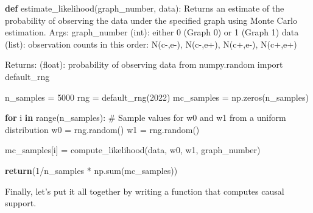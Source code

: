\documentclass[
  letterpaper,
  DIV=11,
  numbers=noendperiod]{scrreprt}
\newenvironment{Shaded}{\begin{snugshade}}{\end{snugshade}}
\newcommand{\BuiltInTok}[1]{\textcolor[rgb]{0.00,0.23,0.31}{#1}}
\newcommand{\CommentTok}[1]{\textcolor[rgb]{0.37,0.37,0.37}{#1}}
\newcommand{\ControlFlowTok}[1]{\textcolor[rgb]{0.00,0.23,0.31}{\textbf{#1}}}
\newcommand{\DecValTok}[1]{\textcolor[rgb]{0.68,0.00,0.00}{#1}}
\newcommand{\ImportTok}[1]{\textcolor[rgb]{0.00,0.46,0.62}{#1}}
\newcommand{\KeywordTok}[1]{\textcolor[rgb]{0.00,0.23,0.31}{\textbf{#1}}}
\newcommand{\NormalTok}[1]{\textcolor[rgb]{0.00,0.23,0.31}{#1}}
\newcommand{\OperatorTok}[1]{\textcolor[rgb]{0.37,0.37,0.37}{#1}}
\begin{document}
\begin{Shaded}
\begin{Highlighting}[]
\KeywordTok{def}\NormalTok{ estimate\_likelihood(graph\_number, data): }
  \CommentTok{\textquotesingle{}\textquotesingle{}\textquotesingle{}}
\CommentTok{  Returns an estimate of the probability of observing the data}
\CommentTok{    under the specified graph using Monte Carlo estimation.}
\CommentTok{     }
\CommentTok{  Args:}
\CommentTok{    graph\_number (int): either 0 (Graph 0) or 1 (Graph 1)}
\CommentTok{    data (list): observation counts in this order:}
\CommentTok{      N(c{-},e{-}), N(c{-},e+), N(c+,e{-}), N(c+,e+)}

\CommentTok{  Returns:}
\CommentTok{    (float): probability of observing data}
\CommentTok{  \textquotesingle{}\textquotesingle{}\textquotesingle{}}
  \ImportTok{from}\NormalTok{ numpy.random }\ImportTok{import}\NormalTok{ default\_rng}
  
\NormalTok{  n\_samples }\OperatorTok{=} \DecValTok{5000}
\NormalTok{  rng }\OperatorTok{=}\NormalTok{ default\_rng(}\DecValTok{2022}\NormalTok{)}
\NormalTok{  mc\_samples }\OperatorTok{=}\NormalTok{ np.zeros(n\_samples)}
  
  \ControlFlowTok{for}\NormalTok{ i }\KeywordTok{in} \BuiltInTok{range}\NormalTok{(n\_samples):}
    \CommentTok{\# Sample values for w0 and w1 from a uniform distribution}
\NormalTok{    w0 }\OperatorTok{=}\NormalTok{ rng.random()}
\NormalTok{    w1 }\OperatorTok{=}\NormalTok{ rng.random()}
    
\NormalTok{    mc\_samples[i] }\OperatorTok{=}\NormalTok{ compute\_likelihood(data, w0, w1, graph\_number)}
  
  \ControlFlowTok{return}\NormalTok{(}\DecValTok{1}\OperatorTok{/}\NormalTok{n\_samples }\OperatorTok{*}\NormalTok{ np.}\BuiltInTok{sum}\NormalTok{(mc\_samples))}
\end{Highlighting}
\end{Shaded}

Finally, let's put it all together by writing a function that computes
causal support.
\end{document}
